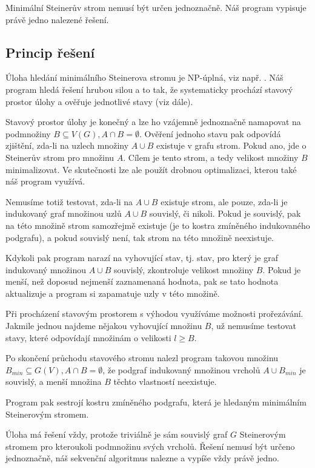 \documentclass[12pt]{article}
\theoremstyle{definition}
\begin{document}
Minimální Steinerův strom nemusí být určen jednoznačně. Náš program vypisuje právě jedno nalezené řešení.
\subsection{Princip řešení}\label{subPrincip}
Úloha hledání minimálního Steinerova stromu je NP-úplná, viz např. \cite{npc}.
Náš program hledá řešení hrubou silou a to tak, že systematicky prochází
stavový prostor úlohy a ověřuje jednotlivé stavy (viz dále).

Stavový prostor úlohy je konečný a lze ho vzájemně jednoznačně namapovat na podmnožiny $B\subseteq V(G), A\cap B = \emptyset$.
Ověření jednoho stavu pak odpovídá zjištění, zda-li na uzlech množiny $A\cup B$ existuje
v grafu strom. Pokud ano, jde o Steinerův strom pro množinu $A$. Cílem je tento strom, a tedy velikost
množiny $B$ minimalizovat. Ve skutečnosti lze ale použít drobnou optimalizaci, kterou
také náš program využívá.

Nemusíme totiž testovat, zda-li na $A\cup B$ existuje strom, ale pouze,
zda-li je indukovaný graf množinou uzlů $A\cup B$ souvislý, či nikoli. Pokud je
souvislý, pak na této množině strom samozřejmě existuje (je to kostra zmíněného indukovaného podgrafu), a pokud souvislý není, tak strom na této množině neexistuje.

Kdykoli pak program narazí na vyhovující stav, tj. stav, pro který je graf indukovaný množinou $A\cup B$ souvislý, zkontroluje velikost množiny $B$. Pokud je menší, než doposud nejmenší zaznamenaná hodnota, pak se tato hodnota aktualizuje a program si
zapamatuje uzly v této množině.

Při procházení stavovým prostorem s výhodou využíváme možnosti prořezávání. Jakmile
jednou najdeme nějakou vyhovující množinu $B$, už nemusíme testovat stavy, které odpovídají množinám o velikosti $l \geq B$.

Po skončení průchodu stavového stromu nalezl program takovou množinu $B_{min}\subseteq G(V), A\cap B = \emptyset$, že podgraf indukovaný množinou vrcholů $A\cup B_{min}$ je souvislý, a menší množina $B$ těchto vlastností neexistuje.

Program pak sestrojí kostru zmíněného podgrafu, která je hledaným minimálním Steinerovým stromem.

Úloha má řešení vždy, protože triviálně je sám souvislý graf $G$ Steinerovým stromem pro kteroukoli podmnožinu svých vrcholů. Řešení nemusí být určeno jednoznačně, náš sekvenční algoritmus nalezne a vypíše vždy právě jedno.
\end{document}
